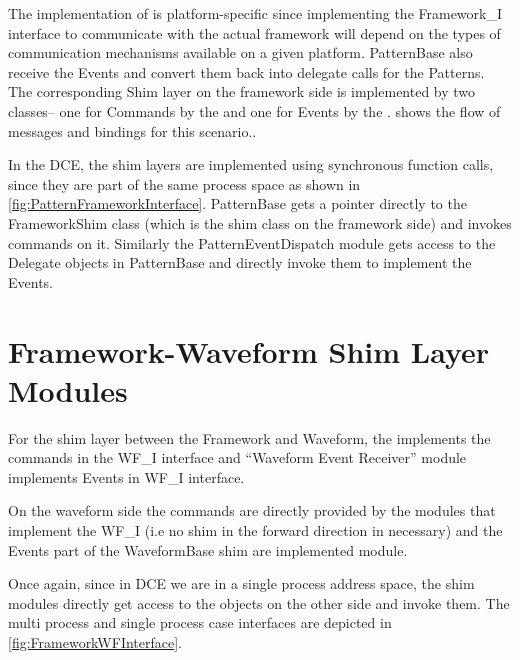 The implementation of  is platform-specific since implementing the Framework\_I interface to communicate with the actual framework will depend on the types of communication mechanisms available on a given platform. PatternBase also receive the  Events and convert them back into delegate calls for the Patterns. The corresponding Shim layer on the framework side is implemented by two classes-- one for Commands by the  and one for Events by the .  shows the flow of messages and bindings for this scenario..

In the DCE, the shim layers are implemented using synchronous function calls, since they are part of the same process space as shown in \cref{fig:PatternFrameworkInterface}. PatternBase gets a pointer directly to the FrameworkShim class (which is the shim class on the framework side) and invokes commands on it. Similarly the PatternEventDispatch module gets access to the Delegate objects in PatternBase and directly invoke them to implement the Events. 
 
\section{Framework-Waveform Shim Layer Modules} \label{sec:WaveformFrameworkInterface}
 
For the shim layer between the Framework and Waveform, the  implements the commands in the WF\_I interface and ``Waveform Event Receiver'' module implements Events in WF\_I interface. 

On the waveform side the commands are directly provided by the modules that implement the WF\_I (i.e no shim in the forward direction in necessary) and the Events part of the WaveformBase shim are implemented  module.

Once again, since in DCE we are in a single process address space, the shim modules directly get access to the objects on the other side and invoke them. The multi process and single process case interfaces are depicted in \cref{fig:FrameworkWFInterface}.

